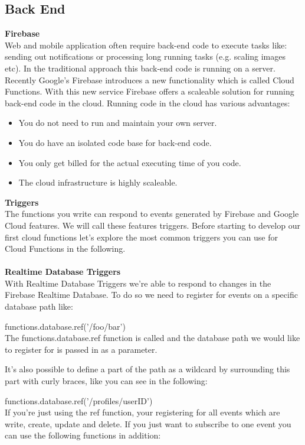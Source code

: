 \subsection{Back End}
\textbf{Firebase}\\
Web and mobile application often require back-end code to execute tasks like: sending out notifications or processing long running tasks (e.g. scaling images etc). In the traditional approach this back-end code is running on a server.\\
Recently Google’s Firebase introduces a new functionality which is called Cloud Functions. With this new service Firebase offers a scaleable solution for running back-end code in the cloud. Running code in the cloud has various advantages:
\begin{itemize}
	\item You do not need to run and maintain your own server.
	\item You do have an isolated code base for back-end code.
	\item You only get billed for the actual executing time of you code.
	\item The cloud infrastructure is highly scaleable.\\
\end{itemize}
\textbf{Triggers}\\
The functions you write can respond to events generated by Firebase and Google Cloud features. We will call these features triggers. Before starting to develop our first cloud functions let’s explore the most common triggers you can use for Cloud Functions in the following.\\
\\
\textbf{Realtime Database Triggers}\\
With Realtime Database Triggers we’re able to respond to changes in the Firebase Realtime Database. To do so we need to register for events on a specific database path like:

functions.database.ref('/foo/bar')\\
The functions.database.ref function is called and the database path we would like to register for is passed in as a parameter.

It’s also possible to define a part of the path as a wildcard by surrounding this part with curly braces, like you can see in the following:

functions.database.ref('/profiles/{userID}')\\
If you’re just using the ref function, your registering for all events which are write, create, update and delete. If you just want to subscribe to one event you can use the following functions in addition:

